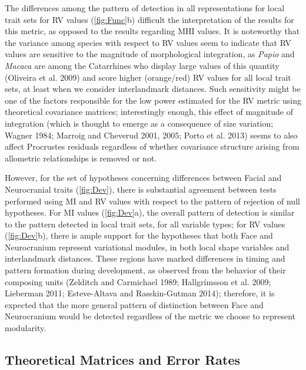 \documentclass[12pt,]{article}
\begin{document}
The differences among the pattern of detection in all representations
for local trait sets for RV values (\autoref{fig:Func}b) difficult the
interpretation of the results for this metric, as opposed to the results
regarding MHI values. It is noteworthy that the variance among species
with respect to RV values seem to indicate that RV values are sensitive
to the magnitude of morphological integration, as \emph{Papio} and
\emph{Macaca} are among the Catarrhines who display large values of this
quantity (Oliveira et al. 2009) and score higher (orange/red) RV values
for all local trait sets, at least when we consider interlandmark
distances. Such sensitivity might be one of the factors responsible for
the low power estimated for the RV metric using theoretical covariance
matrices; interestingly enough, this effect of magnitude of integration
(which is thought to emerge as a consequence of size variation; Wagner
1984; Marroig and Cheverud 2001, 2005; Porto et al. 2013) seems to also
affect Procrustes residuals regardless of whether covariance structure
arising from allometric relationships is removed or not.

However, for the set of hypotheses concerning differences between Facial
and Neurocranial traits (\autoref{fig:Dev}), there is substantial
agreement between tests performed using MI and RV values with respect to
the pattern of rejection of null hypotheses. For MI values
(\autoref{fig:Dev}a), the overall pattern of detection is similar to the
pattern detected in local trait sets, for all variable types; for RV
values (\autoref{fig:Dev}b), there is ample support for the hypotheses
that both Face and Neurocranium represent variational modules, in both
local shape variables and interlandmark distances. These regions have
marked differences in timing and pattern formation during development,
as observed from the behavior of their composing units (Zelditch and
Carmichael 1989; Hallgrímsson et al. 2009; Lieberman 2011; Esteve-Altava
and Rasskin-Gutman 2014); therefore, it is expected that the more
general pattern of distinction between Face and Neurocranium would be
detected regardless of the metric we choose to represent modularity.

\subsection{Theoretical Matrices and Error
Rates}\label{theoretical-matrices-and-error-rates}
\end{document}
